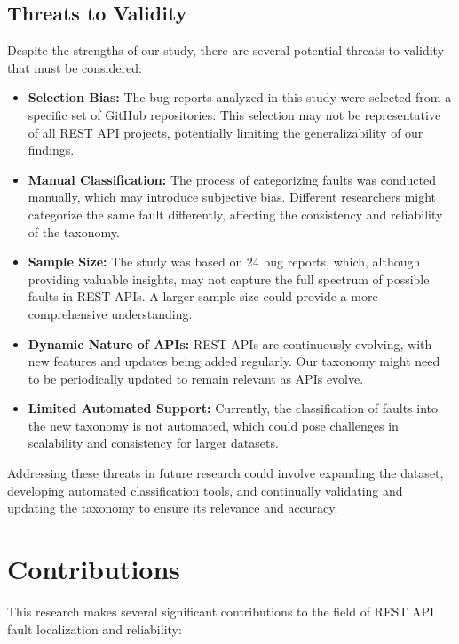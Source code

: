 \documentclass[conference]{IEEEtran}
\begin{document}
\subsection{Threats to Validity}

Despite the strengths of our study, there are several potential threats to validity that must be considered:

\begin{itemize}
    \item \textbf{Selection Bias:} The bug reports analyzed in this study were selected from a specific set of GitHub repositories. This selection may not be representative of all REST API projects, potentially limiting the generalizability of our findings.
    \item \textbf{Manual Classification:} The process of categorizing faults was conducted manually, which may introduce subjective bias. Different researchers might categorize the same fault differently, affecting the consistency and reliability of the taxonomy.
    \item \textbf{Sample Size:} The study was based on 24 bug reports, which, although providing valuable insights, may not capture the full spectrum of possible faults in REST APIs. A larger sample size could provide a more comprehensive understanding.
    \item \textbf{Dynamic Nature of APIs:} REST APIs are continuously evolving, with new features and updates being added regularly. Our taxonomy might need to be periodically updated to remain relevant as APIs evolve.
    \item \textbf{Limited Automated Support:} Currently, the classification of faults into the new taxonomy is not automated, which could pose challenges in scalability and consistency for larger datasets.
\end{itemize}

Addressing these threats in future research could involve expanding the dataset, developing automated classification tools, and continually validating and updating the taxonomy to ensure its relevance and accuracy.

\section{Contributions}
\label{sec:contributions}

This research makes several significant contributions to the field of REST API fault localization and reliability:
\end{document}
